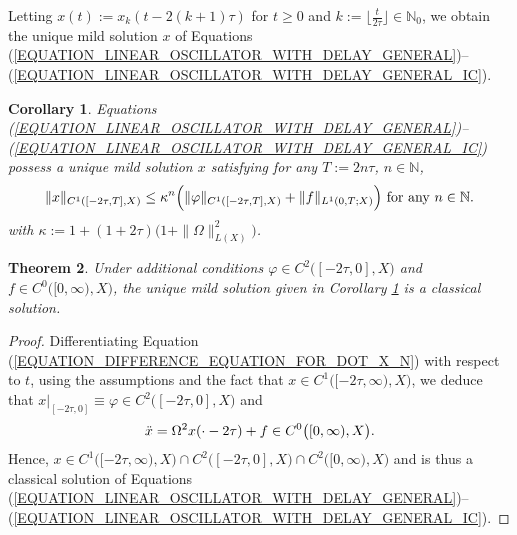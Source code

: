 \documentclass[12pt]{article}
\newtheorem{theorem}{Theorem}[section]
\newtheorem{corollary}[theorem]{Corollary}
\numberwithin{equation}{section}
\numberwithin{equation}{section}
\begin{document}
	Letting $x(t) := x_{k}(t - 2 (k + 1) \tau)$ for $t \geq 0$ and $k := \lfloor \tfrac{t}{2\tau}\rfloor \in \mathbb{N}_{0}$,
	we obtain the unique mild solution $x$ of Equations (\ref{EQUATION_LINEAR_OSCILLATOR_WITH_DELAY_GENERAL})--(\ref{EQUATION_LINEAR_OSCILLATOR_WITH_DELAY_GENERAL_IC}).
	\begin{corollary}
		\label{COROLLARY_MILD_SOLUTION}
		Equations (\ref{EQUATION_LINEAR_OSCILLATOR_WITH_DELAY_GENERAL})--(\ref{EQUATION_LINEAR_OSCILLATOR_WITH_DELAY_GENERAL_IC})
		possess a unique mild solution $x$ satisfying for any $T := 2n\tau$, $n \in \mathbb{N}$,
		\begin{equation}
			\|x\|_{C^{1}([-2\tau, T], X)} \leq
			\kappa^{n} \Big(\|\varphi\|_{C^{1}([-2\tau, T], X)} + \|f\|_{L^{1}(0, T;  X)}\Big)
			\text{ for any } n \in \mathbb{N}. \notag
		\end{equation}
		with $\kappa := 1 + (1 + 2\tau) \big(1 + \|\Omega\|_{L(X)}^{2}\big)$.
	\end{corollary}

	\begin{theorem}
	      Under additional conditions $\varphi \in C^{2}\big([-2\tau, 0], X\big)$ and
	      $f \in C^{0}\big([0, \infty), X\big)$, the unique mild solution given in Corollary \ref{COROLLARY_MILD_SOLUTION}
	      is a classical solution.
	\end{theorem}

	\begin{proof}
		Differentiating Equation (\ref{EQUATION_DIFFERENCE_EQUATION_FOR_DOT_X_N}) with respect to $t$,
		using the assumptions and the fact that $x \in C^{1}\big([-2\tau, \infty), X\big)$,
		we deduce that $x|_{[-2\tau, 0]} \equiv \varphi \in C^{2}\big([-2\tau, 0], X\big)$ and
		\begin{equation}
		      \ddot{x} = \Omega^{2} x(\cdot - 2\tau) + f \in C^{0}\big([0, \infty), X\big). \notag
		\end{equation}
		Hence, $x \in C^{1}\big([-2\tau, \infty), X\big) \cap C^{2}\big([-2\tau, 0], X\big) \cap C^{2}\big([0, \infty), X\big)$
		and is thus a classical solution of Equations
		(\ref{EQUATION_LINEAR_OSCILLATOR_WITH_DELAY_GENERAL})--(\ref{EQUATION_LINEAR_OSCILLATOR_WITH_DELAY_GENERAL_IC}).
	\end{proof}
\end{document}

